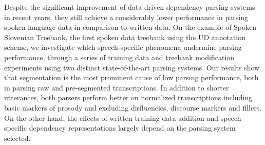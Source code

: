 Despite the significant improvement of data-driven dependency parsing systems in recent years, they still achieve a considerably lower performance in parsing spoken language data in comparison to written data. On the example of Spoken Slovenian Treebank, the first spoken data treebank using the UD annotation scheme, we investigate which speech-specific phenomena undermine parsing performance, through a series of training data and treebank modification experiments using two distinct state-of-the-art parsing systems. Our results show that segmentation is the most prominent cause of low parsing performance, both in parsing raw and pre-segmented transcriptions. In addition to shorter utterances, both parsers perform better on normalized transcriptions including basic markers of prosody and excluding disfluencies, discourse markers and fillers. On the other hand, the effects of written training data addition and speech-specific dependency representations largely depend on the parsing system selected.
